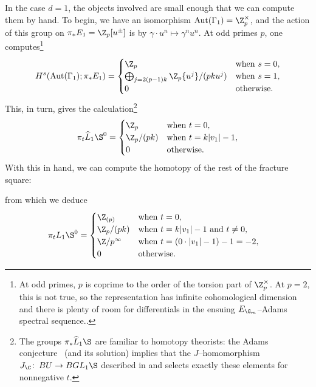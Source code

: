 \begin{example}[Adams]\label{piLK1SExample}
In the case $d = 1$, the objects involved are small enough that we can compute them by hand.  To begin, we have an isomorphism $\operatorname{Aut}(\Gamma_1) = \Z_p^\times$, and the action of this group on $\pi_* E_1 = \Z_p[u^\pm]$ is by $\gamma \cdot u^n \mapsto \gamma^n u^n$.  At odd primes $p$, one computes\footnote{At odd primes, $p$ is coprime to the order of the torsion part of $\Z_p^\times$.  At $p = 2$, this is not true, so the representation has infinite cohomological dimension and there is plenty of room for differentials in the ensuing $E_{\G_m}$--Adams spectral sequence..} \[H^s(\operatorname{Aut}(\Gamma_1); \pi_* E_1) = \begin{cases}\Z_p & \text{when $s = 0$}, \\ \bigoplus_{j = 2(p-1)k} \Z_p\{u^j\} / (pk u^j) & \text{when $s = 1$}, \\ 0 & \text{otherwise}. \end{cases}\]  This, in turn, gives the calculation\footnote{The groups $\pi_* \widehat L_1 \S$ are familiar to homotopy theorists: the Adams conjecture~\cite{AdamsJXIV} (and its solution) implies that the $J$--homomorphism $J_{\C}\co BU \to BGL_1 \S$ described in  and  selects exactly these elements for nonnegative $t$.}
\[
\pi_t \widehat L_1 \S^0 = \begin{cases} \Z_p & \text{when $t = 0$}, \\ \Z_p / (pk) & \text{when $t = k|v_1| - 1$}, \\ 0 & \text{otherwise}. \end{cases}
\]
With this in hand, we can compute the homotopy of the rest of the fracture square:
\begin{center}
\end{center}
from which we deduce
\begin{align*}
\pi_t L_1 \S^0 & = \begin{cases} \Z_{(p)} & \text{when $t = 0$}, \\ \Z_p / (pk) & \text{when $t = k|v_1| - 1$ and $t \ne 0$}, \\ \Z/p^\infty & \text{when $t = (0 \cdot |v_1| - 1) - 1 = -2$}, \\ 0 & \text{otherwise}. \end{cases}
\end{align*}
\end{example}

